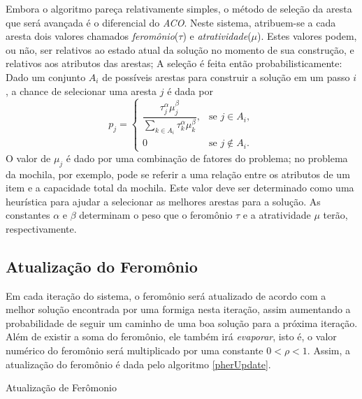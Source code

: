 Embora o algoritmo pareça relativamente simples, o método de seleção da aresta que será avançada é o diferencial do \textit{ACO}. Neste sistema, atribuem-se a cada aresta dois valores chamados \textit{feromônio}($\tau$) e \textit{atratividade}($\mu$). Estes valores podem, ou não, ser relativos ao estado atual da solução no momento de sua construção, e relativos aos atributos das arestas; A seleção é feita então probabilisticamente: Dado um conjunto $A_i$ de possíveis arestas para construir a solução em um passo $i$, a chance de selecionar uma aresta $j$ é dada por
\[ 
	p_j = 
	\begin{cases}
	\dfrac{\tau_j^\alpha \mu_j^\beta}
	{\sum_{k \in A_i} \tau_k^\alpha \mu_k^\beta},
	 & \text{se } j \in A_i,\\
	 0 & \text{se } j \notin A_i.
	\end{cases}
\]
O valor de $\mu_j$ é dado por uma combinação de fatores do problema; no problema da mochila, por exemplo, pode se referir a uma relação entre os atributos de um item e a capacidade total da mochila. Este valor deve ser determinado como uma heurística para ajudar a selecionar as melhores arestas para a solução. As constantes $\alpha$ e $\beta$ determinam o peso que o feromônio $\tau$ e a atratividade $\mu$ terão, respectivamente.

\subsection{Atualização do Feromônio}
Em cada iteração do sistema, o feromônio será atualizado de acordo com a melhor solução encontrada por uma formiga nesta iteração, assim aumentando a probabilidade de seguir um caminho de uma boa solução para a próxima iteração. Além de existir a soma do feromônio, ele também irá \textit{evaporar}, isto é, o valor numérico do feromônio será multiplicado por uma constante $0<\rho<1$. Assim, a atualização do feromônio é dada pelo algoritmo \ref{pherUpdate}.

\begin{algorithm}[ht]
	
	
	\caption{Atualização de Ferômonio}
	\label{pherUpdate}
\end{algorithm}

